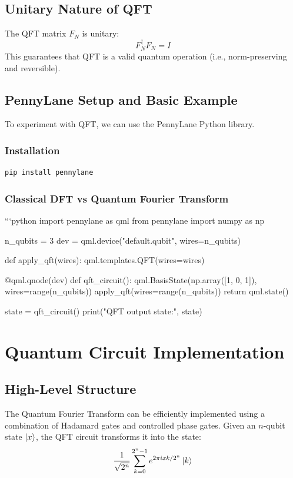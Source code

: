 \documentclass[12pt]{book}
\begin{document}
\section{Unitary Nature of QFT}
The QFT matrix $F_N$ is unitary:
\[
F_N^\dagger F_N = I
\]
This guarantees that QFT is a valid quantum operation (i.e., norm-preserving and reversible).

\section{PennyLane Setup and Basic Example}
To experiment with QFT, we can use the PennyLane Python library.

\subsection*{Installation}
\begin{lstlisting}[language=bash]
pip install pennylane
\end{lstlisting}

\subsection*{Classical DFT vs Quantum Fourier Transform}
```python
import pennylane as qml
from pennylane import numpy as np

n_qubits = 3
dev = qml.device("default.qubit", wires=n_qubits)

def apply_qft(wires):
   qml.templates.QFT(wires=wires)

@qml.qnode(dev)
def qft_circuit():
   qml.BasisState(np.array([1, 0, 1]), wires=range(n_qubits))
   apply_qft(wires=range(n_qubits))
   return qml.state()

state = qft_circuit()
print("QFT output state:", state)


\chapter{Quantum Circuit Implementation}

\section{High-Level Structure}
The Quantum Fourier Transform can be efficiently implemented using a combination of Hadamard gates and controlled phase gates. Given an $n$-qubit state $\ket{x}$, the QFT circuit transforms it into the state:
\[
\frac{1}{\sqrt{2^n}} \sum_{k=0}^{2^n - 1} e^{2\pi i xk / 2^n} \ket{k}
\]
\end{document}
